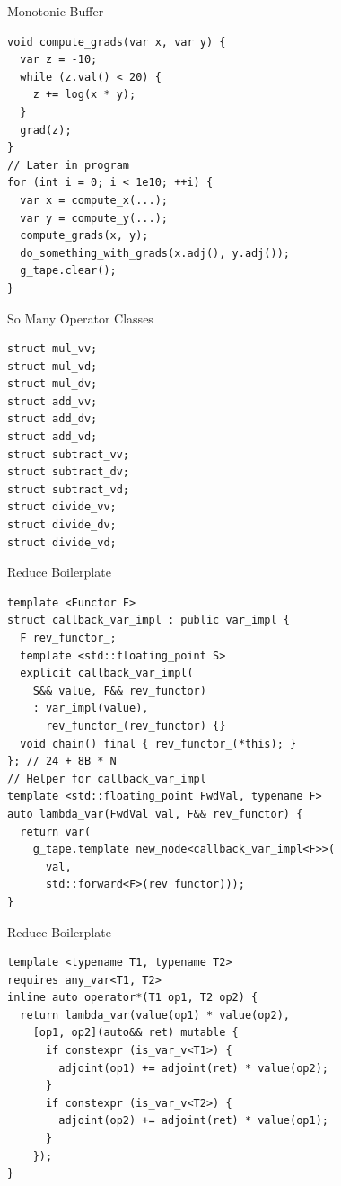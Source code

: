 \documentclass[dvipsnames]{beamer}
\begin{document}
\begin{frame}[fragile]{Monotonic Buffer}
\begin{verbatim}
void compute_grads(var x, var y) {
  var z = -10;
  while (z.val() < 20) {
    z += log(x * y);
  }
  grad(z);
}
// Later in program
for (int i = 0; i < 1e10; ++i) {
  var x = compute_x(...);
  var y = compute_y(...);
  compute_grads(x, y);
  do_something_with_grads(x.adj(), y.adj());
  g_tape.clear();
}
\end{verbatim}
\end{frame}

\begin{frame}[fragile]{So Many Operator Classes}
\begin{verbatim}
struct mul_vv;
struct mul_vd;
struct mul_dv;
struct add_vv;
struct add_dv;
struct add_vd;
struct subtract_vv;
struct subtract_dv;
struct subtract_vd;
struct divide_vv;
struct divide_dv;
struct divide_vd;
\end{verbatim}
\end{frame}


\begin{frame}[fragile]{Reduce Boilerplate}
\begin{verbatim}
template <Functor F>
struct callback_var_impl : public var_impl {
  F rev_functor_;
  template <std::floating_point S>
  explicit callback_var_impl(
    S&& value, F&& rev_functor)
    : var_impl(value),
      rev_functor_(rev_functor) {}
  void chain() final { rev_functor_(*this); }
}; // 24 + 8B * N
// Helper for callback_var_impl
template <std::floating_point FwdVal, typename F>
auto lambda_var(FwdVal val, F&& rev_functor) {
  return var(
    g_tape.template new_node<callback_var_impl<F>>(
      val,
      std::forward<F>(rev_functor)));
}
\end{verbatim}
\end{frame}

\begin{frame}[fragile]{Reduce Boilerplate}
\begin{verbatim}
template <typename T1, typename T2>
requires any_var<T1, T2>
inline auto operator*(T1 op1, T2 op2) {
  return lambda_var(value(op1) * value(op2),
    [op1, op2](auto&& ret) mutable {
      if constexpr (is_var_v<T1>) {
        adjoint(op1) += adjoint(ret) * value(op2);
      }
      if constexpr (is_var_v<T2>) {
        adjoint(op2) += adjoint(ret) * value(op1);
      }
    });
}
\end{verbatim}
\end{frame}
\end{document}
